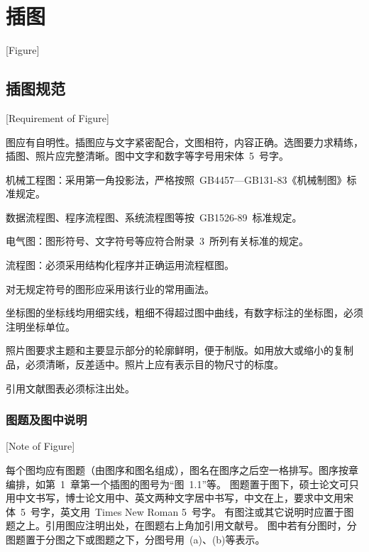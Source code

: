 
%
%
%

\chapter{插图}[Figure]
\label{chap05}

\section{插图规范}[Requirement of Figure]

图应有自明性。插图应与文字紧密配合，文图相符，内容正确。选图要力求精练，插图、照片应完整清晰。图中文字和数字等字号用宋体~5~号字。

机械工程图：采用第一角投影法，严格按照~GB4457---GB131-83《机械制图》标准规定。

数据流程图、程序流程图、系统流程图等按~GB1526-89~标准规定。

电气图：图形符号、文字符号等应符合附录~3~所列有关标准的规定。

流程图：必须采用结构化程序并正确运用流程框图。

对无规定符号的图形应采用该行业的常用画法。

坐标图的坐标线均用细实线，粗细不得超过图中曲线，有数字标注的坐标图，必须注明坐标单位。

照片图要求主题和主要显示部分的轮廓鲜明，便于制版。如用放大或缩小的复制品，必须清晰，反差适中。照片上应有表示目的物尺寸的标度。

引用文献图表必须标注出处。


\subsection{图题及图中说明}[Note of Figure]

每个图均应有图题（由图序和图名组成），图名在图序之后空一格排写。图序按章编排，如第~1~章第一个插图的图号为“图~1.1”等。
图题置于图下，硕士论文可只用中文书写，博士论文用中、英文两种文字居中书写，中文在上，要求中文用宋体~5~号字，英文用~Times New Roman 5~号字。
有图注或其它说明时应置于图题之上。引用图应注明出处，在图题右上角加引用文献号。
图中若有分图时，分图题置于分图之下或图题之下，分图号用~(a)、(b)等表示。

